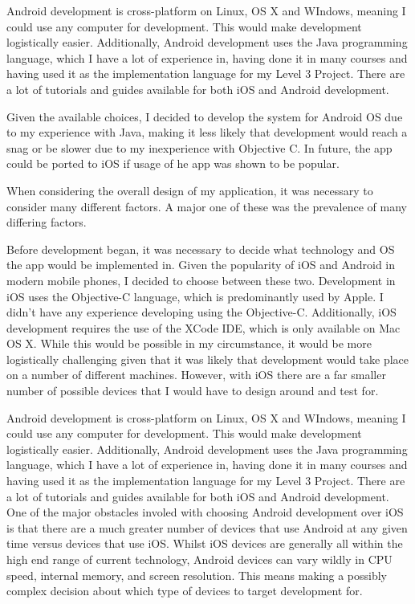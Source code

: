 \documentclass{l4proj}
\begin{document}
Android development is cross-platform on Linux, OS X and WIndows, meaning I could use any computer for development. This would make development logistically easier. Additionally, Android development uses the Java programming language, which I have a lot of experience in, having done it in many courses and having used it as the implementation language for my Level 3 Project. There are a lot of tutorials and guides available for both iOS and Android development.

Given the available choices, I decided to develop the system for Android OS due to my experience with Java, making it less likely that development would reach a snag or be slower due to my inexperience with Objective C. In future, the app could be ported to iOS if usage of he app was shown to be popular.

When considering the overall design of my application, it was necessary to consider many different factors. A major one of these was the prevalence of many differing factors.

Before development began, it was necessary to decide what technology and OS the app would be implemented in. Given the popularity of iOS and Android in modern mobile phones, I decided to choose between these two. Development in iOS uses the Objective-C language, which is predominantly used by Apple. I didn’t have any experience developing using the Objective-C. Additionally, iOS development requires the use of the XCode IDE, which is only available on Mac OS X.  While this would be possible in my circumstance, it would be more logistically challenging given that it was likely that development would take place on a number of different machines. However, with iOS there are a far smaller number of possible devices that I would have to design around and test for.

Android development is cross-platform on Linux, OS X and WIndows, meaning I could use any computer for development. This would make development logistically easier. Additionally, Android development uses the Java programming language, which I have a lot of experience in, having done it in many courses and having used it as the implementation language for my Level 3 Project. There are a lot of tutorials and guides available for both iOS and Android development. One of the major obstacles involed with choosing Android development over iOS is that there are a much greater number of devices that use Android at any given time versus devices that use iOS. Whilst iOS devices are generally all within the high end range of current technology, Android devices can vary wildly in CPU speed, internal memory, and screen resolution. This means making a possibly complex decision about which type of devices to target development for.
\end{document}
